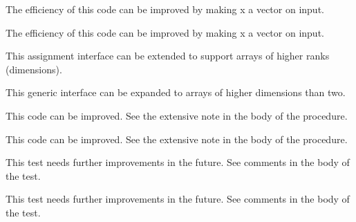 \begin{DoxyRefList}
%
 The efficiency of this code can be improved by making {\ttfamily x} a vector on input. 
\item[Subprogram \mbox{\hyperlink{namespaceStatistics__mod_a6f2bac87eb4e963f359c89840f4702a3}{Statistics\+\_\+mod\+::get\+Beta\+CDF\+\_\+\+RK64}} (alpha, beta, x)]\label{todo__todo000076}%
%
 The efficiency of this code can be improved by making {\ttfamily x} a vector on input. 
\item[(=) Type \mbox{\hyperlink{interfaceString__mod_1_1assignment_07_0a_08}{String\+\_\+mod\+::assignment(=)}} ]\label{todo__todo000078}%
%
 This assignment interface can be extended to support arrays of higher ranks (dimensions). 
\item[Type \mbox{\hyperlink{interfaceString__mod_1_1val2str}{String\+\_\+mod\+::val2str}} ]\label{todo__todo000077}%
%
 This generic interface can be expanded to arrays of higher dimensions than two. 
\item[Subprogram \mbox{\hyperlink{namespaceSystem__mod_a8f999de90840ba33f9cf7f30edd41b3d}{System\+\_\+mod\+::copy\+File}} (path\+Old, path\+New, is\+Unix\+Shell, Err)]\label{todo__todo000080}%
%
 This code can be improved. See the extensive note in the body of the procedure.  
\item[Subprogram \mbox{\hyperlink{namespaceSystem__mod_acdbe0231b40135bc08ab285fc69f2b80}{System\+\_\+mod\+::get\+System\+Info}} (List, Err, OS, count, cache\+File)]\label{todo__todo000079}%
%
 This code can be improved. See the extensive note in the body of the procedure.  
\item[Subprogram \mbox{\hyperlink{namespaceTest__System__mod_a56a58918b2888e7ea0fa691de93cdeb3}{Test\+\_\+\+System\+\_\+mod\+::test\+\_\+\+Cmd\+Arg\+\_\+type\+\_\+1}} ()]\label{todo__todo000087}%
%
 This test needs further improvements in the future. See comments in the body of the test.  
\item[Subprogram \mbox{\hyperlink{namespaceTest__System__mod_a43fd8159ffe52170057e95d4e0c38d63}{Test\+\_\+\+System\+\_\+mod\+::test\+\_\+\+Env\+Var\+\_\+type\+\_\+1}} ()]\label{todo__todo000084}%
%
 This test needs further improvements in the future. See comments in the body of the test.  
\item[Subprogram \mbox{\hyperlink{namespaceTest__System__mod_ab0121f340538dae91c97cc5cdcba0a7b}{Test\+\_\+\+System\+\_\+mod\+::test\+\_\+\+Env\+Var\+\_\+type\+\_\+2}} ()]\label{todo__todo000085}%

\end{DoxyRefList}
